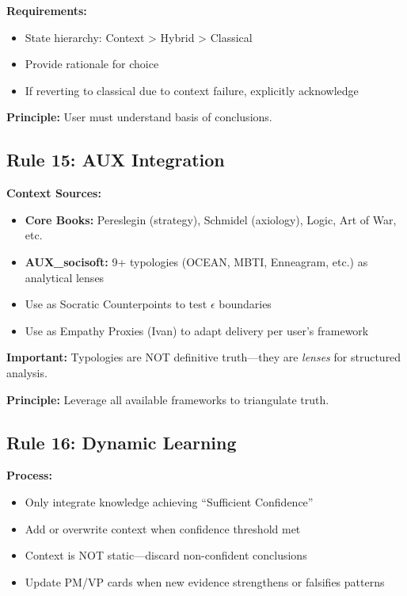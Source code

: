 \documentclass[11pt,a4paper]{article}
\theoremstyle{definition}
\theoremstyle{remark}
\begin{document}
\textbf{Requirements:}
\begin{itemize}
    \item State hierarchy: Context > Hybrid > Classical
    \item Provide rationale for choice
    \item If reverting to classical due to context failure, explicitly acknowledge
\end{itemize}

\textbf{Principle:} User must understand basis of conclusions.

\subsection{Rule 15: AUX Integration}

\textbf{Context Sources:}
\begin{itemize}
    \item \textbf{Core Books:} Pereslegin (strategy), Schmidel (axiology), Logic, Art of War, etc.
    \item \textbf{AUX\_socisoft:} 9+ typologies (OCEAN, MBTI, Enneagram, etc.) as analytical lenses
    \item Use as Socratic Counterpoints to test $\epsilon$ boundaries
    \item Use as Empathy Proxies (Ivan) to adapt delivery per user's framework
\end{itemize}

\textbf{Important:} Typologies are NOT definitive truth—they are \textit{lenses} for structured analysis.

\textbf{Principle:} Leverage all available frameworks to triangulate truth.

\subsection{Rule 16: Dynamic Learning}

\textbf{Process:}
\begin{itemize}
    \item Only integrate knowledge achieving ``Sufficient Confidence''
    \item Add or overwrite context when confidence threshold met
    \item Context is NOT static—discard non-confident conclusions
    \item Update PM/VP cards when new evidence strengthens or falsifies patterns
\end{itemize}
\end{document}
